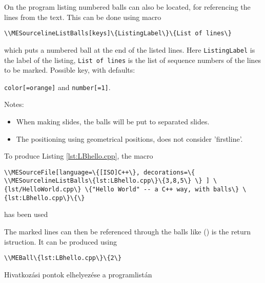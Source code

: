 {
On the program listing numbered balls can also be located, for referencing the 
lines from the text. This can be done using macro
\par\noindent\lstinline|\\MESourcelineListBalls[keys]\{ListingLabel\}\{List of lines\}|
\par\noindent which puts a numbered ball at the end of the listed lines.
Here \lstinline|ListingLabel| is the label of the listing, \lstinline|List of lines|
is the list of sequence numbers of the lines to be marked.
Possible key, with defaults:
\par\noindent\lstinline|color[=orange]| and \lstinline|number[=1]|. 


Notes:
\begin{itemize}
\item When making slides, the balls will be put to separated slides.
\item The positioning using geometrical positions, does not consider 'firstline'.
\end{itemize}

To produce Listing \ref{lst:LBhello.cpp}, the macro

\par\noindent\lstinline|\\MESourceFile[language=\{[ISO]C++\},
decorations=\{
\\MESourcelineListBalls\{lst:LBhello.cpp\}\{3,8,5\}
\}
] \{lst/HelloWorld.cpp\} \{"Hello World" -- a C++ way, with balls\} \{lst:LBhello.cpp\}\{\}|
\par\noindent has been used


The marked lines can then be referenced through the balls like ()
is the return istruction. It can be produced using 
\par\noindent\lstinline|\\MEBall\{lst:LBhello.cpp\}\{2\}|
}
{Hivatkozási pontok elhelyezése a programlistán}
